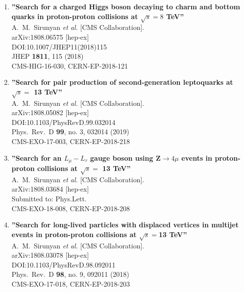 \begin{enumerate}
\item%
{\bf ''Search for a charged Higgs boson decaying to charm and bottom quarks in proton-proton collisions at $ \sqrt{s}=8 $ TeV''}
  \\{}A.~M.~Sirunyan {\it et al.} [CMS Collaboration].
  \\{}arXiv:1808.06575 [hep-ex]
  \\{}DOI:10.1007/JHEP11(2018)115
  \\{}JHEP {\bf 1811}, 115 (2018)
  \\{}CMS-HIG-16-030, CERN-EP-2018-121

\item%
{\bf ''Search for pair production of second-generation leptoquarks at $\sqrt{s}=$ 13 TeV''}
  \\{}A.~M.~Sirunyan {\it et al.} [CMS Collaboration].
  \\{}arXiv:1808.05082 [hep-ex]
  \\{}DOI:10.1103/PhysRevD.99.032014
  \\{}Phys.\ Rev.\ D {\bf 99}, no. 3, 032014 (2019)
  \\{}CMS-EXO-17-003, CERN-EP-2018-218

\item%
{\bf ''Search for an $L_{\mu}-L_{\tau}$ gauge boson using Z$\to4\mu$ events in proton-proton collisions at $\sqrt{s} =$ 13 TeV''}
  \\{}A.~M.~Sirunyan {\it et al.} [CMS Collaboration].
  \\{}arXiv:1808.03684 [hep-ex]
  \\{}Submitted to: Phys.Lett.
  \\{}CMS-EXO-18-008, CERN-EP-2018-208

\item%
{\bf ''Search for long-lived particles with displaced vertices in multijet events in proton-proton collisions at $\sqrt{s}= $13 TeV''}
  \\{}A.~M.~Sirunyan {\it et al.} [CMS Collaboration].
  \\{}arXiv:1808.03078 [hep-ex]
  \\{}DOI:10.1103/PhysRevD.98.092011
  \\{}Phys.\ Rev.\ D {\bf 98}, no. 9, 092011 (2018)
  \\{}CMS-EXO-17-018, CERN-EP-2018-203


\end{enumerate}

